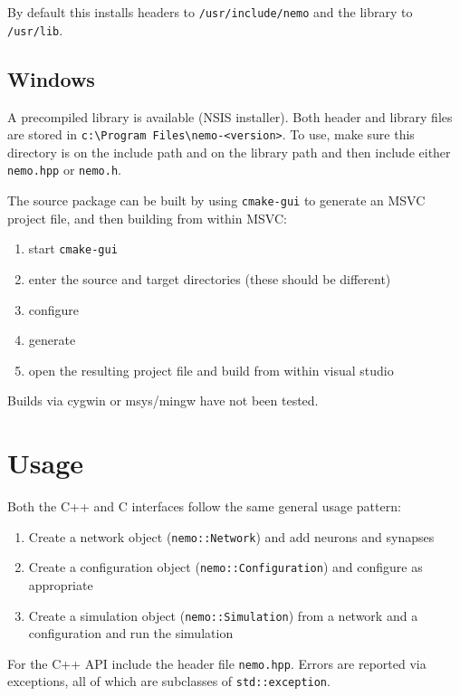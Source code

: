 \documentclass[a4paper]{article}
\newcommand{\code}[1]{\texttt{#1}}
\newcommand{\command}[1]{\texttt{#1}}
\newcommand{\file}[1]{\texttt{#1}}
\newcommand{\directory}[1]{\texttt{#1}}
\begin{document}
By default this installs headers to \directory{/usr/include/nemo} and the
library to \directory{/usr/lib}. 

\subsection{Windows}

A precompiled library is available (NSIS installer).
Both header and library files are stored in \directory{c:\textbackslash Program Files\textbackslash nemo-<version>}.
To use, make sure this directory is on the include path and on the library path
and then include either \file{nemo.hpp} or \file{nemo.h}.

The source package can be built by using \command{cmake-gui} to generate an MSVC project file,
	and then building from within MSVC:

\begin{enumerate}
	\item start \command{cmake-gui}
	\item enter the source and target directories (these should be different)
	\item configure
	\item generate
	\item open the resulting project file and build from within visual studio
\end{enumerate}

Builds via cygwin or msys/mingw have not been tested.

\section{Usage}

Both the C++ and C interfaces follow the same general usage pattern:

\begin{enumerate}
	\item Create a network object (\code{nemo::Network}) and add neurons and synapses
	\item Create a configuration object (\code{nemo::Configuration}) and configure as appropriate
	\item Create a simulation object (\code{nemo::Simulation}) from a network and a configuration and run the simulation
\end{enumerate}

For the C++ API include the header file \file{nemo.hpp}.
Errors are reported via exceptions, all of which are subclasses of \code{std::exception}.
\end{document}
